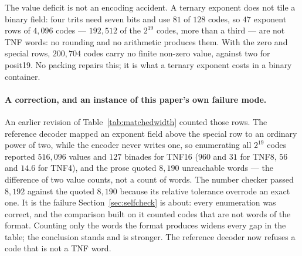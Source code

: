 The value deficit is not an encoding accident. A ternary exponent does not tile
a binary field: four trits need seven bits and use $81$ of $128$ codes, so $47$
exponent rows of $4{,}096$ codes --- $192{,}512$ of the $2^{19}$ codes, more than a
third --- are not TNF words: no rounding and no arithmetic produces them. With the
zero and special rows, $200{,}704$ codes carry no finite non-zero value, against
two for posit19. No packing repairs this; it is what a ternary exponent costs in
a binary container.

\paragraph{A correction, and an instance of this paper's own failure mode.}
An earlier revision of Table~\ref{tab:matchedwidth} counted those rows. The
reference decoder mapped an exponent field above the special row to an ordinary
power of two, while the encoder never writes one, so enumerating all $2^{19}$
codes reported $516{,}096$ values and $127$ binades for TNF16 ($960$ and $31$
for TNF8, $56$ and $14.6$ for TNF4), and the prose quoted $8{,}190$ unreachable
words --- the difference of two value counts, not a count of words. The number
checker passed $8{,}192$ against the quoted $8{,}190$ because its relative
tolerance overrode an exact one. It is the failure Section~\ref{sec:selfcheck}
is about: every enumeration was correct, and the comparison built on it counted
codes that are not words of the format. Counting only the words the format
produces widens every gap in the table; the conclusion stands and is stronger.
The reference decoder now refuses a code that is not a TNF word.

